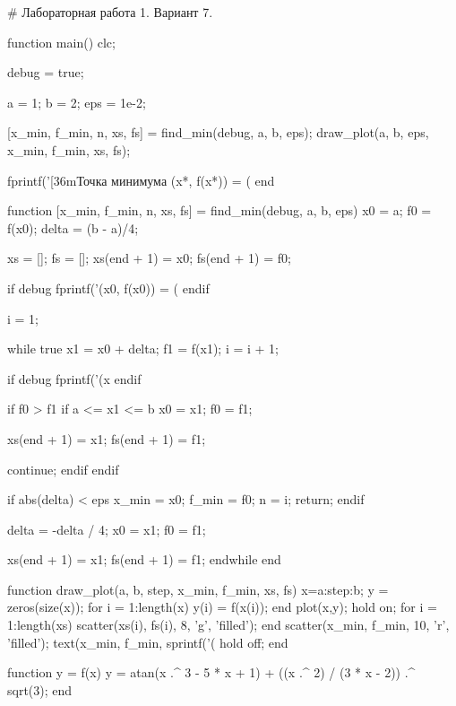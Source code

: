 # Лабораторная работа 1. Вариант 7.

function main()
  clc;

  debug = true;

  a = 1;
  b = 2;
  eps = 1e-2;

  [x_min, f_min, n, xs, fs] = find_min(debug, a, b, eps);
  draw_plot(a, b, eps, x_min, f_min, xs, fs);

  fprintf('\n{}[36mТочка минимума (x*, f(x*)) = (%
end

function [x_min, f_min, n, xs, fs] = find_min(debug, a, b, eps)
  x0 = a;
  f0 = f(x0);
  delta = (b - a)/4;

  xs = [];
  fs = [];
  xs(end + 1) = x0;
  fs(end + 1) = f0;

  if debug
    fprintf('(x0, f(x0)) = (%
  endif

  i = 1;

  while true
    x1 = x0 + delta;
    f1 = f(x1);
    i = i + 1;

    if debug
      fprintf('(x%
    endif

    if f0 > f1
      if a <= x1 <= b
        x0 = x1;
        f0 = f1;

        xs(end + 1) = x1;
        fs(end + 1) = f1;

        continue;
      endif
    endif

    if abs(delta) < eps
      x_min = x0;
      f_min = f0;
      n = i;
      return;
    endif

    delta = -delta / 4;
    x0 = x1;
    f0 = f1;

    xs(end + 1) = x1;
    fs(end + 1) = f1;
  endwhile
end

function draw_plot(a, b, step, x_min, f_min, xs, fs)
  x=a:step:b;
  y = zeros(size(x));
  for i = 1:length(x)
      y(i) = f(x(i));
  end
  plot(x,y);
  hold on;
  for i = 1:length(xs)
      scatter(xs(i), fs(i), 8, 'g', 'filled');
  end
  scatter(x_min, f_min, 10, 'r', 'filled');
  text(x_min, f_min, sprintf('\n\n\n\n(%
  hold off;
end

function y = f(x)
  y = atan(x .^ 3 - 5 * x + 1) + ((x .^ 2) / (3 * x - 2)) .^ sqrt(3);
end